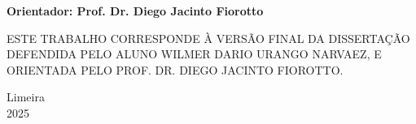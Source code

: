 \vspace{0.1cm}

\begin{flushleft}
	\begin{minipage}[c]{.6\textwidth}
		\textbf{Orientador: Prof. Dr. Diego Jacinto Fiorotto} %
	\end{minipage}
\end{flushleft}

\vspace{0.1cm}

\begin{flushleft}
	\begin{minipage}[c]{.46\textwidth}
		ESTE TRABALHO CORRESPONDE À VERSÃO FINAL DA DISSERTAÇÃO DEFENDIDA PELO ALUNO WILMER DARIO URANGO NARVAEZ, E ORIENTADA PELO PROF. DR. DIEGO JACINTO FIOROTTO.
	\end{minipage}
\end{flushleft}




\vspace{4cm}

\begin{center}
	Limeira\\2025
\end{center}





